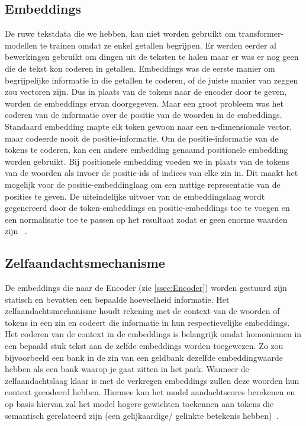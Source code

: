 \subsection{Embeddings}
De ruwe tekstdata die we hebben, kan niet worden gebruikt om transformer-modellen te trainen omdat ze enkel getallen begrijpen. Er werden eerder al bewerkingen gebruikt om dingen uit de teksten te halen maar er was er nog geen die de tekst kon coderen in getallen. Embeddings was de eerste manier om begrijpelijke informatie in die getallen te coderen, of de juiste manier van zeggen zou vectoren zijn. Dus in plaats van de tokens naar de encoder door te geven, worden de embeddings ervan doorgegeven. Maar een groot probleem was het coderen van de informatie over de positie van de woorden in de embeddings. Standaard embedding mapte elk token gewoon naar een n-dimensionale vector, maar codeerde nooit de positie-informatie.
Om de positie-informatie van de tokens te coderen, kan een andere embedding genaamd positionele embedding worden gebruikt. Bij positionele embedding voeden we in plaats van de tokens van de woorden als invoer de positie-ids of indices van elke zin in. Dit maakt het mogelijk voor de positie-embeddinglaag om een nuttige representatie van de posities te geven. De uiteindelijke uitvoer van de embeddingslaag wordt gegenereerd door de token-embeddings en positie-embeddings toe te voegen en een normalisatie toe te passen op het resultaat zodat er geen enorme waarden zijn ~\autocite{Suresh2022}.

\subsection{Zelfaandachtsmechanisme}
De embeddings die naar de Encoder (zie \ref{ssec:Encoder}) worden gestuurd zijn statisch en bevatten een bepaalde hoeveelheid informatie. Het zelfaandachtsmechanisme houdt rekening met de context van de woorden of tokens in een zin en codeert die informatie in hun respectievelijke embeddings. Het coderen van de context in de embeddings is belangrijk omdat homoniemen in een bepaald stuk tekst aan de zelfde embeddings worden toegewezen. Zo zou bijvoorbeeld een bank in de zin van een geldbank dezelfde embeddingwaarde hebben als een bank waarop je gaat zitten in het park. Wanneer de zelfaandachtslaag klaar is met de verkregen embeddings zullen deze woorden hun context gecodeerd hebben. Hiermee kan het model aandachtscores berekenen en op basis hiervan zal het model hogere gewichten toekennen aan tokens die semantisch gerelateerd zijn (een gelijkaardige/ gelinkte betekenis hebben)~\autocite{Suresh2022}. 


